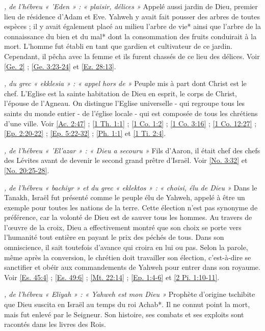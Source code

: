 \begin{multicols}{2}
\textit{, de l'hébreu « 'Eden » : « plaisir, délices »}\newline
Appelé aussi jardin de Dieu, premier lieu de résidence d'Adam et Eve. Yahweh y avait fait pousser des arbres de toutes espèces ; il y avait également placé au milieu l'arbre de vie* ainsi que l'arbre de la connaissance du bien et du mal* dont la consommation des fruits conduirait à la mort. L'homme fut établi en tant que gardien et cultivateur de ce jardin. Cependant, il pêcha avec la femme et ils furent chassés de ce lieu des délices. Voir \vref{Ge. 2} ; \vref{Ge. 3:23-24} et \vref{Ez. 28:13}.

\textit{, du grec « ekklesia » : « appel hors de »}\newline
Peuple mis à part dont Christ est le chef. L'Eglise est la sainte habitation de Dieu en esprit, le corps de Christ, l'épouse de l'Agneau. On distingue l'Eglise universelle - qui regroupe tous les saints du monde entier - de l'église locale - qui est composée de tous les chrétiens d'une ville. Voir \vref{Ac. 2:47} ; \vref{1 Th. 1:1} ; \vref{1 Co. 1:2} ; \vref{1 Co. 3:16} ; \vref{1 Co. 12:27} ; \vref{Ep. 2:20-22} ; \vref{Ep. 5:22-32} ; \vref{Ph. 1:1} et \vref{1 Ti. 2:4}.

\textit{, de l'hébreu « 'El'azar » : « Dieu a secouru »}\newline
Fils d'Aaron, il était chef des chefs des Lévites avant de devenir le second grand prêtre d'Israël. Voir \vref{No. 3:32} et \vref{No. 20:25-28}.

\textit{, de l'hébreu « bachiyr » et du grec « eklektos » : « choisi, élu de Dieu »}\newline
Dans le Tanakh, Israël fut présenté comme le peuple élu de Yahweh, appelé à être un exemple pour toutes les nations de la terre. Cette élection n'est pas synonyme de préférence, car la volonté de Dieu est de sauver tous les hommes. Au travers de l'œuvre de la croix, Dieu a effectivement montré que son choix se porte vers l'humanité tout entière en payant le prix des péchés de tous. Dans son omniscience, il sait toutefois d'avance qui croira en lui ou pas. Selon la parole, même après la conversion, le chrétien doit travailler son élection, c'est-à-dire se sanctifier et obéir aux commandements de Yahweh pour entrer dans son royaume. Voir \vref{Es. 45:4} ; \vref{Es. 49:6} ; \vref{Mt. 22:14} ; \vref{Ep. 1:4-6} et \vref{2 Pi. 1:10-11}.

\textit{, de l'hébreu « Eliyah » : « Yahweh est mon Dieu »}\newline
Prophète d'origine tschibite que Dieu suscita en Israël au temps du roi Achab*. Il ne connut point la mort, mais fut enlevé par le Seigneur. Son histoire, ses combats et ses exploits sont racontés dans les livres des Rois.


\end{multicols}
